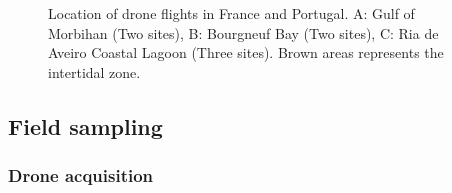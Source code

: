 \documentclass[
  number]{elsarticle}
\begin{document}
\label{cell-fig-map}
\begin{figure}[H]


\caption{\label{fig-map}Location of drone flights in France and
Portugal. A: Gulf of Morbihan (Two sites), B: Bourgneuf Bay (Two sites),
C: Ria de Aveiro Coastal Lagoon (Three sites). Brown areas represents
the intertidal zone.}

\end{figure}%

\subsection{Field sampling}\label{field-sampling}

\subsubsection{Drone acquisition}\label{drone-acquisition}
\end{document}
